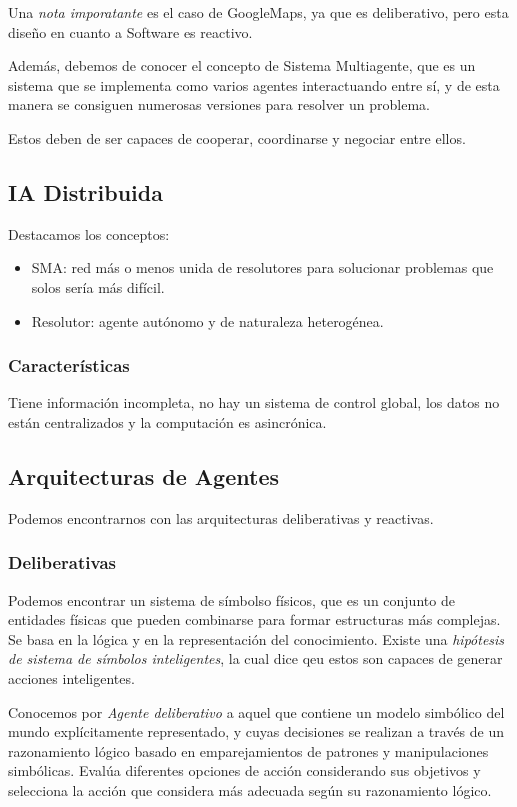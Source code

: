 Una \textit{nota imporatante} es el caso de GoogleMaps, ya que es deliberativo, pero esta diseño en cuanto a Software es reactivo.

Además, debemos de conocer el concepto de Sistema Multiagente, que es un sistema que se implementa como varios agentes interactuando entre sí, y de esta manera se consiguen numerosas versiones para resolver un problema.

Estos deben de ser capaces de cooperar, coordinarse y negociar entre ellos.

\subsection{IA Distribuida}

Destacamos los conceptos:
\begin{itemize}
    \item SMA: red más o menos unida de resolutores para solucionar problemas que solos sería más difícil.
    \item Resolutor: agente autónomo y de naturaleza heterogénea.
\end{itemize}

\subsubsection{Características}

Tiene información incompleta, no hay un sistema de control global, los datos no están centralizados y la computación es asincrónica.

\subsection{Arquitecturas de Agentes}

Podemos encontrarnos con las arquitecturas deliberativas y reactivas.

\subsubsection{Deliberativas}

Podemos encontrar un sistema de símbolso físicos, que es un conjunto de entidades físicas que pueden combinarse para formar estructuras más complejas. Se basa en la lógica y en la representación del conocimiento. Existe una \textit{hipótesis de sistema de símbolos inteligentes}, la cual dice qeu estos son capaces de generar acciones inteligentes.

Conocemos por \textit{Agente deliberativo} a  aquel que contiene un modelo simbólico del
mundo explícitamente representado, y cuyas decisiones se realizan a
través de un razonamiento lógico basado en emparejamientos de
patrones y manipulaciones simbólicas. Evalúa diferentes opciones de
acción considerando sus objetivos y selecciona la acción que
considera más adecuada según su razonamiento lógico.

